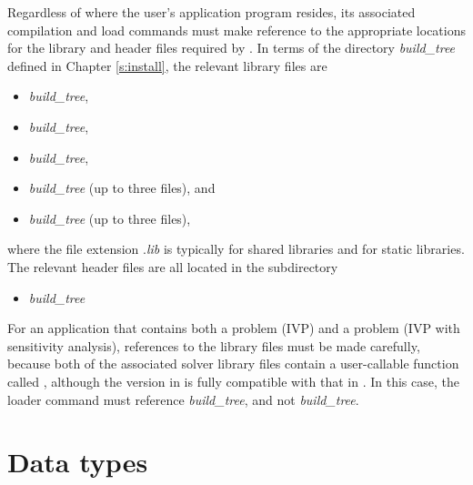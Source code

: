 Regardless of where the user's application program resides, its
associated compilation and load commands must make reference to the
appropriate locations for the library and header files required by
{\cvode}.  In terms of the directory {\em build\_tree} defined in
Chapter \ref{s:install}, the relevant library files are
\begin{itemize}
\item {\em build\_tree},
\item {\em build\_tree},
\item {\em build\_tree},
\item {\em build\_tree} (up to three files),
  and
\item {\em build\_tree} (up to three files),
\end{itemize}
where the file extension .{\em lib} is typically  for shared libraries
and  for static libraries. The relevant header files are all located in
the subdirectory
\begin{itemize}
\item {\em build\_tree}
\end{itemize}

For an application that contains both a {\cvode} problem (IVP) and a
{\cvodes} problem (IVP with sensitivity analysis), 
references to the library files must be made carefully, because both
of the associated solver library files contain a user-callable
function called , although the version in {\cvodes} is fully
compatible with that in {\cvode}.  In this case, the loader command
must reference {\em build\_tree}, and not 
{\em build\_tree}.

\section{Data types}\label{s:types}


